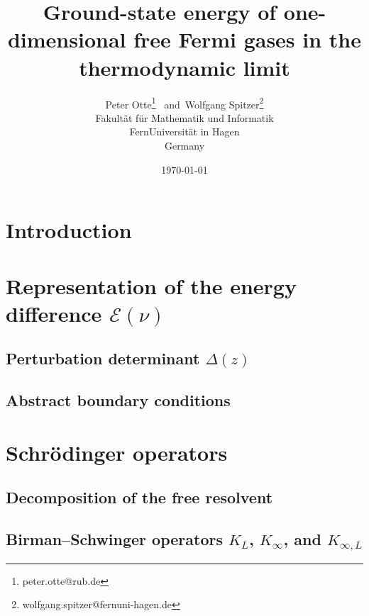 \documentclass[10pt,a4paper,abstracton,toc=bibliography,DIV=12]{scrartcl} %
\numberwithin{equation}{section}
\begin{document}
\title{Ground-state energy of one-dimensional free Fermi gases in the thermodynamic limit}
\author{
Peter Otte\thanks{peter.otte@rub.de} 
\ and\
Wolfgang Spitzer\thanks{wolfgang.spitzer@fernuni-hagen.de}\\ 
Fakult\"at f\"ur Mathematik und Informatik\\ 
FernUniversit\"at in Hagen\\ 
Germany}
\date{\today}
\maketitle
\begin{abstract}

\end{abstract}
%
\tableofcontents
%
\section{Introduction\label{introduction}}

%
\section{Representation of the energy difference \texorpdfstring{$\mathcal{E}(\nu)$}{}\label{energy}}

%
\subsection{Perturbation determinant \texorpdfstring{$\Delta(z)$}{}\label{pd}}

%
\subsection{Abstract boundary conditions\label{abc}}

%
\section{Schr\"odinger operators\label{schroedinger}}

%
\subsection{Decomposition of the free resolvent\label{fr}}

%
\subsection{Birman--Schwinger operators \texorpdfstring{$K_L$, $K_\infty$, and $K_{\infty,L}$}{}\label{bso}}

%
\end{document}
